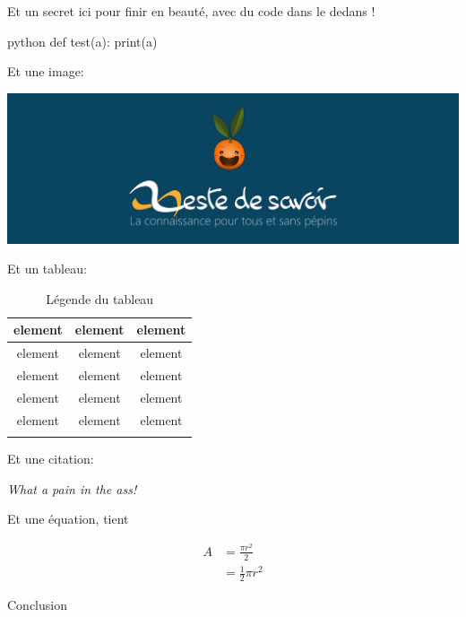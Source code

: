 \documentclass[small]{zmdocument}
\begin{document}
\levelOneConclusion

\begin{Spoiler}
Et un secret ici pour finir en beauté, avec du code dans le dedans !

\begin{CodeBlock}[][1]{python}
def test(a):
    print(a)
\end{CodeBlock}

Et une image:

\begin{center}
\includegraphics[width=\linewidth]{./test-images/logo.png}
\end{center}

Et un tableau:

\begin{longtabu}{|c|c|c|} \hline
element & element & element\\ \hline
element & element & element\\ \hline
element & element & element\\ \hline
element & element & element\\ \hline
element & element & element\\ \hline
\caption{Légende du tableau}
\end{longtabu}

Et une citation:

\begin{Quotation}[me]
\textit{What a pain in the ass!}
\end{Quotation}

Et une équation, tient

\[
\begin{split}
A & = \frac{\pi r^2}{2} \\
 & = \frac{1}{2} \pi r^2
\end{split}
\]

\end{Spoiler}

Conclusion
\end{document}
